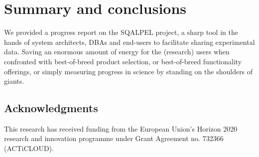 \documentclass{cidr-2019}
\begin{document}
\section{Summary and conclusions}\label{Summary and conclusions}

We provided a progress report on the {\sc SQALPEL} project, a sharp tool in the
hands of system architects, DBAs and end-users to facilitate sharing experimental data. 
Saving an enormous amount of energy for the (research) users when confronted with best-of-breed product
selection, or best-of-breed functionality offerings, or simply measuring progress in science
by standing on the shoulders of giants.







\subsection*{Acknowledgments} This research has received funding from the European Union's Horizon 2020 research and innovation programme under Grant Agreement no. 732366 (ACTiCLOUD).

{\small  
 }
\end{document}
